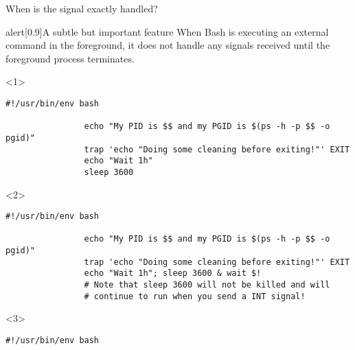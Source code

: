 \begin{frame}[fragile]{When is the signal exactly handled?}
    \vspace{-5mm}
    \begin{varblock}{alert}[0.9\textwidth]{A subtle but important feature}
        When Bash is executing an external command in the foreground, it does not handle any signals received until the foreground process terminates.
    \end{varblock}
    \vspace{2mm}
    \begin{overlayarea}{\textwidth}{0.28\textheight}
        \begin{onlyenv}<1>
            \begin{lstlisting}[style=MyBash]
                #!/usr/bin/env bash

                echo "My PID is $$ and my PGID is $(ps -h -p $$ -o pgid)"
                trap 'echo "Doing some cleaning before exiting!"' EXIT
                echo "Wait 1h"
                sleep 3600
            \end{lstlisting}
        \end{onlyenv}
        \begin{onlyenv}<2>
            \begin{lstlisting}[style=MyBash, firstnumber=6]
                #!/usr/bin/env bash

                echo "My PID is $$ and my PGID is $(ps -h -p $$ -o pgid)"
                trap 'echo "Doing some cleaning before exiting!"' EXIT
                echo "Wait 1h"; sleep 3600 & wait $!
                # Note that sleep 3600 will not be killed and will
                # continue to run when you send a INT signal!
            \end{lstlisting}
        \end{onlyenv}
        \begin{onlyenv}<3>
            \begin{lstlisting}[style=MyBash, firstnumber=12]
                #!/usr/bin/env bash


\end{lstlisting}
\end{onlyenv}
\end{overlayarea}
\end{frame}
